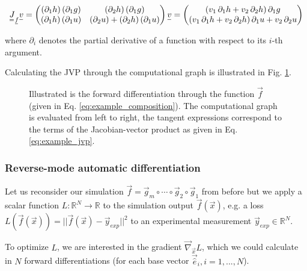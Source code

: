 \begin{equation}
    \mat{J}_\vec{f} \vec{v} = \begin{pmatrix}
                                (\partial_1 h)\,(\partial_1 g) & (\partial_2 h)\,(\partial_1 g) \\
                                (\partial_1 h)\,(\partial_1 u) & (\partial_2 u) + (\partial_2 h)\,(\partial_1 u)
                              \end{pmatrix} \vec{v}
                            = \begin{pmatrix}
                                (v_1\,\partial_1 h + v_2\,\partial_2 h)\,\partial_1 g \\
                                (v_1\,\partial_1 h + v_2\,\partial_2 h)\,\partial_1 u + v_2\,\partial_2 u
                              \end{pmatrix}
    \label{eq:example_jvp}
\end{equation}

where $\partial_i$ denotes the partial derivative of a function with respect to its $i$-th argument.

Calculating the JVP through the computational graph is illustrated in Fig. \ref{fig:forward_diff}.

\begin{figure}[!htb]
 \centering
 \hfill
 \caption{Illustrated is the forward differentiation through the function 
 $\vec{f}$ (given in Eq. \ref{eq:example_composition}). The computational
 graph is evaluated from left to right, the tangent expressions correspond
 to the terms of the Jacobian-vector product as given in Eq. \ref{eq:example_jvp}.}
 \label{fig:forward_diff}
\end{figure}

\subsubsection{Reverse-mode automatic differentiation}
Let us reconsider our simulation $\vec{f} = \vec{g}_m \circ \cdots \circ \vec{g}_2 \circ \vec{g}_1$ from before
but we apply a scalar function $L: \mathbb{R}^N \rightarrow \mathbb{R}$ to the simulation output $\vec{f}(\vec{x})$,
e.g. a loss $L(\vec{f}(\vec{x})) = ||\vec{f}(\vec{x}) - \vec{y}_{exp}||^2$ to an experimental measurement $\vec{y}_{exp} \in \mathbb{R}^N$.

To optimize $L$, we are interested in the gradient $\vec{\nabla}_\vec{x}L$, which we could calculate in $N$ forward
differentiations (for each base vector $\vec{\hat{e}}_i, i = 1,...,N$).

